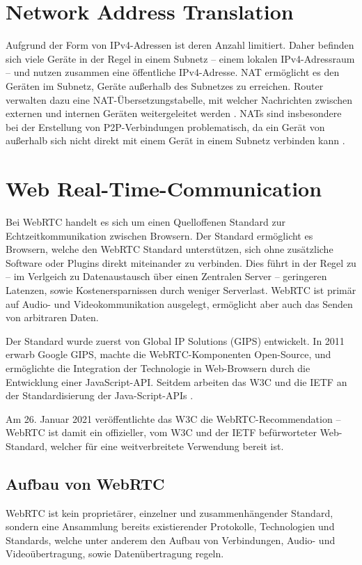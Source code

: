 \section{Network Address Translation}
Aufgrund der Form von \acs{IP}v4-Adressen ist deren Anzahl limitiert. Daher befinden sich viele Geräte in der Regel in einem Subnetz -- einem lokalen \acs{IP}v4-Adressraum -- und nutzen zusammen eine öffentliche \acs{IP}v4-Adresse. \acf{NAT} ermöglicht es den Geräten im Subnetz, Geräte außerhalb des Subnetzes zu erreichen. Router verwalten dazu eine \acs{NAT}-Übersetzungstabelle, mit welcher Nachrichten zwischen externen und internen Geräten weitergeleitet werden \cite{baun}. \acs{NAT}s sind insbesondere bei der Erstellung von \acs{P2P}-Verbindungen problematisch, da ein Gerät von außerhalb sich nicht direkt mit einem Gerät in einem Subnetz verbinden kann \cite{natproblemsRFC}.

\section{Web Real-Time-Communication}
Bei \ac{WebRTC} handelt es sich um einen Quelloffenen Standard zur Echtzeitkommunikation zwischen Browsern. Der Standard ermöglicht es Browsern, welche den \acs{WebRTC} Standard unterstützen, sich ohne zusätzliche Software oder Plugins direkt miteinander zu verbinden. Dies führt in der Regel zu -- im Verlgeich zu Datenaustausch über einen Zentralen Server -- geringeren Latenzen, sowie Kostenersparnissen durch weniger Serverlast. WebRTC ist primär auf Audio- und Videokommunikation ausgelegt, ermöglicht aber auch das Senden von arbitraren Daten.\par

Der Standard wurde zuerst von Global IP Solutions (GIPS) entwickelt. In 2011 erwarb Google GIPS, machte die \acs{WebRTC}-Komponenten Open-Source, und ermöglichte die Integration der Technologie in Web-Browsern durch die Entwicklung einer JavaScript-\acs{API}. Seitdem arbeiten das \acs{W3C} und die \acf{IETF} an der Standardisierung der Java-Script-\acs{API}s \cite{loreto2014}.

Am 26. Januar 2021 veröffentlichte das \acs{W3C} die \acs{WebRTC}-Recommendation -- \acs{WebRTC} ist damit ein offizieller, vom \acs{W3C} und der \acs{IETF} befürworteter Web-Standard, welcher für eine weitverbreitete Verwendung bereit ist. 

\subsection{Aufbau von WebRTC}
WebRTC ist kein proprietärer, einzelner und zusammenhängender Standard, sondern eine Ansammlung bereits existierender Protokolle, Technologien und Standards, welche unter anderem den Aufbau von Verbindungen, Audio- und Videoübertragung, sowie Datenübertragung regeln.\par

